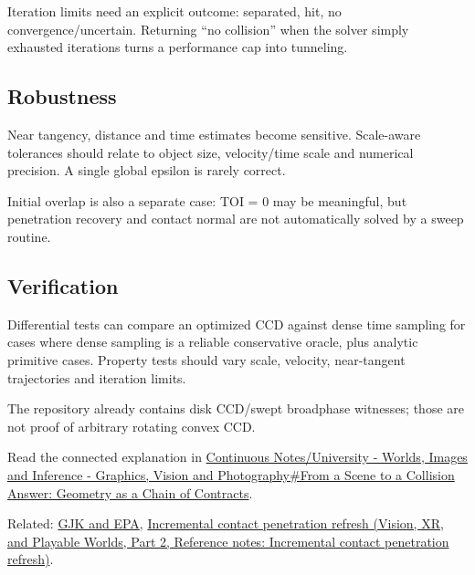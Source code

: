 Iteration limits need an explicit outcome: separated, hit, no convergence/uncertain. Returning ``no collision'' when the solver simply exhausted iterations turns a performance cap into tunneling.

\subsection{Robustness}\label{appendix-66956ed6c753-robustness}

\hypertarget{appendix-66956ed6c753-robustness}{}

Near tangency, distance and time estimates become sensitive. Scale-aware tolerances should relate to object size, velocity/time scale and numerical precision. A single global epsilon is rarely correct.

Initial overlap is also a separate case: TOI = 0 may be meaningful, but penetration recovery and contact normal are not automatically solved by a sweep routine.

\subsection{Verification}\label{appendix-66956ed6c753-verification}

\hypertarget{appendix-66956ed6c753-verification}{}

Differential tests can compare an optimized CCD against dense time sampling for cases where dense sampling is a reliable conservative oracle, plus analytic primitive cases. Property tests should vary scale, velocity, near-tangent trajectories and iteration limits.

The repository already contains disk CCD/swept broadphase witnesses; those are not proof of arbitrary rotating convex CCD.

Read the connected explanation in \hyperref[03-visual-computing-i-ch020-from-a-scene-to-a-collision-answer-geometry-as-a-chain-of-contracts]{Continuous Notes/University - Worlds, Images and Inference - Graphics, Vision and Photography\#From a Scene to a Collision Answer: Geometry as a Chain of Contracts}.

Related: \hyperref[appendix-aef6177f7b3f]{GJK and EPA}, \href{../07-Vision-XR-and-Playable-Worlds-P02/main.pdf\#nameddest=appendix-f682275acbdf}{Incremental contact penetration refresh (Vision, XR, and Playable Worlds, Part 2, Reference notes: Incremental contact penetration refresh)}.
